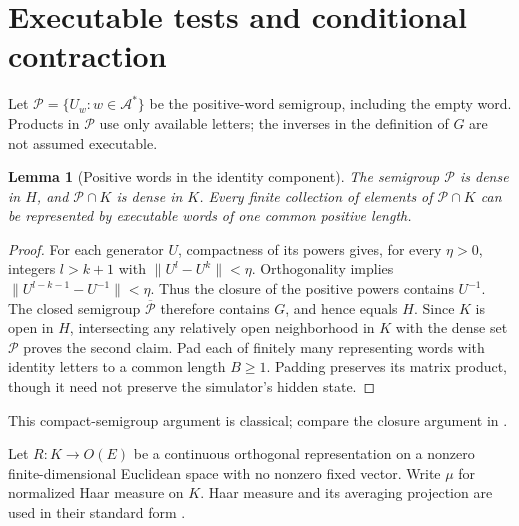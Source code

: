 \documentclass[11pt]{amsart}
\numberwithin{equation}{section}
\newtheorem{lemma}[theorem]{Lemma}
\theoremstyle{definition}
\theoremstyle{remark}
\newcommand{\norm}[1]{\lVert #1\rVert}
\begin{document}
\section{Executable tests and conditional contraction}\label{sec:tests53}
Let $\mathcal P=\{U_w:w\in\mathcal A^*\}$ be the positive-word semigroup, including the empty word. Products in $\mathcal P$ use only available letters; the inverses in the definition of $G$ are not assumed executable.

\begin{lemma}[Positive words in the identity component]\label{lem:positive53}
The semigroup $\mathcal P$ is dense in $H$, and $\mathcal P\cap K$ is dense in $K$. Every finite collection of elements of $\mathcal P\cap K$ can be represented by executable words of one common positive length.
\end{lemma}
\begin{proof}
For each generator $U$, compactness of its powers gives, for every $\eta>0$, integers $l>k+1$ with $\norm{U^l-U^k}<\eta$. Orthogonality implies $\norm{U^{l-k-1}-U^{-1}}<\eta$. Thus the closure of the positive powers contains $U^{-1}$. The closed semigroup $\overline{\mathcal P}$ therefore contains $G$, and hence equals $H$. Since $K$ is open in $H$, intersecting any relatively open neighborhood in $K$ with the dense set $\mathcal P$ proves the second claim. Pad each of finitely many representing words with identity letters to a common length $B\ge1$. Padding preserves its matrix product, though it need not preserve the simulator's hidden state.
\end{proof}
This compact-semigroup argument is classical; compare the closure argument in \cite[Theorem 3.1]{BJKP}.

Let $R:K\to O(E)$ be a continuous orthogonal representation on a nonzero finite-dimensional Euclidean space with no nonzero fixed vector. Write $\mu$ for normalized Haar measure on $K$. Haar measure and its averaging projection are used in their standard form \cite{Folland}.
\end{document}

